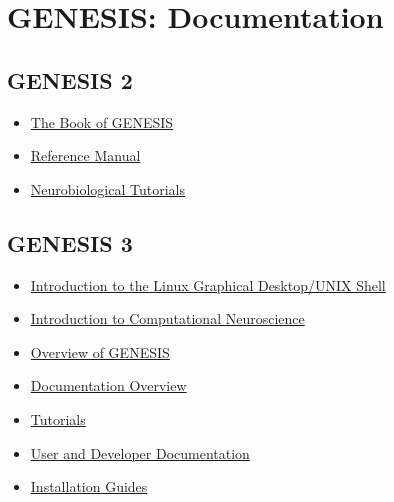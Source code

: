 \documentclass[12pt]{article}
\begin{document}
\section*{GENESIS: Documentation}

\subsection*{GENESIS 2}

\begin{itemize}
 
 \item \href{http://www.genesis-sim.org/documentation}{The Book of GENESIS}

 \item \href{http://www.genesis-sim.org/GENESIS/Hyperdoc/Manual.html}{Reference Manual}

\item \href{http://www.genesis-sim.org/GENESIS/Tutorials_summary.html}{Neurobiological Tutorials}

\end{itemize}

\subsection*{GENESIS 3}

\begin{itemize}

 \item \href{../document-homepage/document-homepage.pdf}{Introduction to the Linux Graphical Desktop/UNIX Shell}

\item \href{../introduction-compneurosci-1/introduction-compneurosci-1.pdf}{Introduction to Computational Neuroscience}

\item \href{../genesis-overview/genesis-overview.pdf}{Overview of GENESIS}

\item \href{../document-overview/document-overview.pdf}{Documentation Overview}

\item \href{../contents-level1/contents-level1.pdf/}{Tutorials}

\item \href{../contents-level2/contents-level2.pdf}{User and Developer Documentation}

\item \href{../installation/installation.pdf}{Installation Guides}

\end{itemize}
\end{document}
